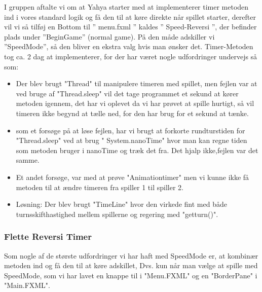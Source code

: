 I gruppen aftalte vi om at Yahya starter med at implementerer timer metoden ind i vores standard logik og få den til at køre direkte når spillet starter, derefter vil vi så tilføj en Bottom til ” menu.fxml ” kaldes ” Speed-Reversi ”, der befinder plads under ”BeginGame” (normal game).
På den måde adskiller vi ”SpeedMode”, så den bliver en ekstra valg hvis man ønsker det. 
Timer-Metoden tog ca. 2 dag at implementerer, for der har været nogle udfordringer undervejs så som: 
\begin{itemize}

\item Der blev brugt "Thread" til manipulere timeren med spillet, men fejlen var at ved bruge af "Thread.sleep" vil det tage programmet et sekund at kører metoden igennem, det har vi oplevet da vi har prøvet at spille hurtigt, så vil timeren ikke begynd at tælle ned, for den har brug for et sekund at tænke. 
\item som et forsøge på at løse fejlen, har vi brugt at forkorte rundturstiden for "Thread.sleep" ved at brug " System.nanoTime" hvor man kan regne tiden som metoden bruger i nanoTime og træk det fra. Det hjalp ikke,fejlen var det samme. 
\item Et andet forsøge, var med at prøve "Animationtimer" men vi kunne ikke få metoden til at ændre timeren fra spiller 1 til spiller 2. 

\item Løsning: 
Der blev brugt "TimeLine" hvor den virkede fint med både turnsskifthastighed mellem spillerne og regering med "getturn()". 
\end{itemize}
\subsubsection{Flette Reversi Timer}
Som nogle af de største udfordringer vi har haft med SpeedMode er, at kombinær metoden ind og få den til at køre adskillet, Dvs. kun når man vælge at spille med SpeedMode, som vi har lavet en knappe til i "Menu.FXML" og en "BorderPane" i "Main.FXML".
